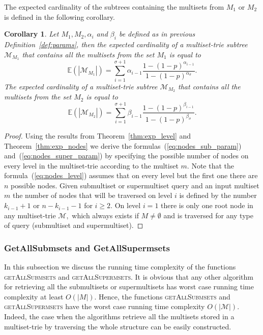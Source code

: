 \documentclass[10pt,letterpaper]{article}
\newtheorem{corollary}{Corollary}
\begin{document}
The expected cardinality of the subtrees containing the multisets from $M_1$ or $M_2$ 
is defined in the following corollary.

\begin{corollary}\label{cor:exp_nodes_param}
Let $M_1, M_2, \alpha_i$ and $\beta_i$ be defined as in previous Definition~\ref{def:params}, 
then the expected cardinality of a multiset-trie subtree $\mathcal{M}_{M_1}$ that contains all the multisets 
from the set $M_1$ is equal to 
\begin{equation}\label{eq:nodes_sub_param}
\mathbb{E}( |\mathcal{M}_{M_1}| ) = \sum_{i=1}^{\sigma + 1} \alpha_{i-1} \frac{1-(1-p)^{\alpha_{i-1}}}{1-(1-p)^{\alpha_{\sigma}}}.
\end{equation}
The expected cardinality of a multiset-trie subtree $\mathcal{M}_{M_2}$ that contains all the multisets 
from the set $M_2$ is equal to 
\begin{equation}\label{eq:nodes_super_param}
\mathbb{E}( |\mathcal{M}_{M_2}| ) = \sum_{i=1}^{\sigma + 1} \beta_{i-1} \frac{1-(1-p)^{\beta_{i-1}}}{1-(1-p)^{\beta_{\sigma}}}.
\end{equation}
\end{corollary}
%
\begin{proof}
Using the results from Theorem~\ref{thm:exp_level} and Theorem~\ref{thm:exp_nodes} 
we derive the formulas~(\cref{eq:nodes_sub_param}) and~(\cref{eq:nodes_super_param}) 
by specifying the possible number of nodes on every level in the multiset-trie according 
to the multiset $m.$ Note that the formula~(\cref{eq:nodes_level}) assumes that on every 
level but the first one there are $n$ possible nodes. Given submultiset or supermultiset 
query and an input multiset $m$ the number of nodes that will be traversed on level $i$ is 
defined by the number $k_{i-1}+1$ or $n-k_{i-1}-1$ for $i\geq 2.$ On level $i=1$ 
there is only one root node in any multiset-trie $\mathcal{M},$ which always exists 
if $M\neq\emptyset$ and is traversed for any type of query (submultiset and 
supermultiset).

\end{proof}

\subsubsection{GetAllSubmsets and GetAllSupermsets}\label{ss:getall}
In this subsection we discuss the running time complexity of the functions 
\textsc{getAllSubmsets} and \textsc{getAllSupermsets}. It is obvious that any 
other algorithm for retrieving all the submultisets or supermultisets has worst 
case running time complexity at least $O(|M|).$ Hence, the functions 
\textsc{getAllSubmsets} and \textsc{getAllSupermsets} have the worst case 
running time complexity $O(|\mathcal{M}|).$ Indeed, the case when the algorithms 
retrieve all the multisets stored in a multiset-trie by traversing the whole structure 
can be easily constructed. 
\end{document}
